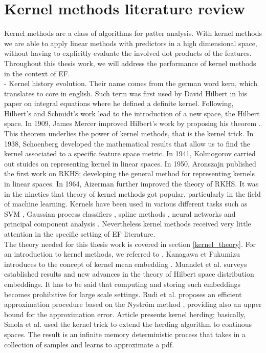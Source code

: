 \section{Kernel methods literature review}
Kernel methods are a class of algorithms for patter analysis.
With kernel methods we are able to apply linear methods with predictors in a high dimensional space, without having to explicitly evaluate the involved dot products of the features.
Throughout this thesis work, we will address the performance of kernel methods in the context of EF.
\\
- Kernel history evolution.
Their name comes from the german word kern, which translates to core in english. Such term was first used by David Hilbert in his paper on integral equations \cite{hilbert} where he defined a definite kernel. Following, Hilbert's and Schmidt's \cite{schmidt} work lead to the introduction of a new space, the Hilbert space.
In 1909, James Mercer improved Hilbert's work by proposing his theorem \cite{mercer}. This theorem underlies the power of kernel methods, that is the kernel trick.
In 1938, Schoenberg \cite{schoenberg} developed the mathematical results that allow us to find the kernel associated to a specific feature space metric.
In 1941, Kolmogorov \cite{kolmogorov} carried out stuides on representing kernel in linear spaces.
In 1950, Aronszajn \cite{aronszajn} published the first work on RKHS; developing the general method for representing kernels in linear spaces.
In 1964, Aizerman \cite{aizerman} further improved the theory of RKHS.
It was in the nineties that theory of kernel methods got popular, particularly in the field of machine learning. Kernels have been used in various different tasks such as SVM \cite{vapnik1} \cite{vapnik2}, Gaussian process classifiers \cite{williams}, spline methods \cite{wahba}, neural networks \cite{poggio} and principal component analysis \cite{pca_scholkopf}.
Nevertheless kernel methods received very little attention in the specific setting of EF literature.
\\
The theory needed for this thesis work is covered in section \ref{kernel_theory}. 
For an introduction to kernel methods, we referred to \cite{learning_with_kernels}.
Kanagawa et Fukumizu introduces to the concept of kernel mean embedding \cite{pmlr}. Muandet et al. \cite{Muandet_2017} surveys established results and new advances in the theory of Hilbert space distribution embeddings. 
It has to be said that computing and storing such embeddings becomes prohibitive for large scale settings. Rudi et al. \cite{2022nystrom} proposes an efficient approximation procedure based on the Nyström method \cite{nystrom}, providing also an upper bound for the approximation error.
Article \cite{supersamples} presents kernel herding; basically, Smola et al. used the kernel trick to extend the herding algorithm to continous spaces. The result is an infinite memory deterministic process that takes in a collection of samples and learns to approximate a pdf.
\\
